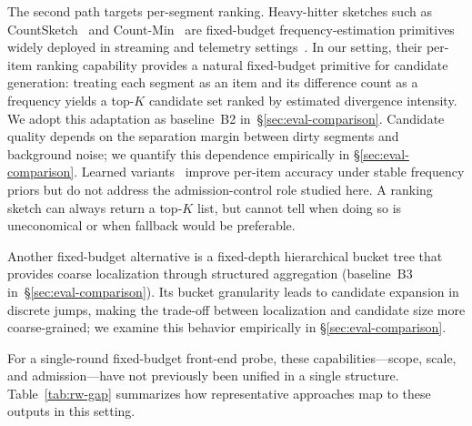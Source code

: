 The second path targets per-segment ranking.
Heavy-hitter sketches such as
CountSketch~\cite{charikar2002finding} and
Count-Min~\cite{cormode2005improved,cormode2008finding} are
fixed-budget frequency-estimation primitives widely deployed
in streaming and telemetry
settings~\cite{estan2002traffic,yu2013opensketch,erlingsson2014rappor,
cormode2018privacy,han2022sketches}.
In our setting, their per-item ranking capability provides a
natural fixed-budget primitive for candidate generation:
treating each segment as an item and its difference count as a
frequency yields a top-$K$ candidate set ranked by estimated
divergence intensity.
We adopt this adaptation as baseline~B2
in~\S\ref{sec:eval-comparison}.
Candidate quality depends on the separation margin between
dirty segments and background noise; we quantify this
dependence empirically in \S\ref{sec:eval-comparison}.
Learned variants~\cite{hsu2019learning} improve per-item
accuracy under stable frequency priors but do not address
the admission-control role studied here.
A ranking sketch can always return a top-$K$ list, but cannot tell when doing so is uneconomical or when fallback would be preferable.


Another fixed-budget alternative is a fixed-depth hierarchical
bucket tree that provides coarse localization through
structured aggregation (baseline~B3
in~\S\ref{sec:eval-comparison}).
Its bucket granularity leads to candidate expansion in
discrete jumps, making the trade-off between localization and
candidate size more coarse-grained; we examine this behavior
empirically in \S\ref{sec:eval-comparison}.

For a single-round fixed-budget front-end probe, these
capabilities---scope, scale, and admission---have not
previously been unified in a single structure.
Table~\ref{tab:rw-gap} summarizes how representative
approaches map to these outputs in this setting.

